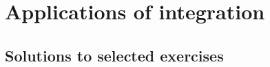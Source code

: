 \documentclass[../book/calcnotes.tex]{subfiles}
\begin{document}
\chapter{Applications of integration}
\label{ch:integral-applications}

\section{Solutions to selected exercises}
\label{sec:integral-applications.solns}
\printsolutions[chapter]
\end{document}
